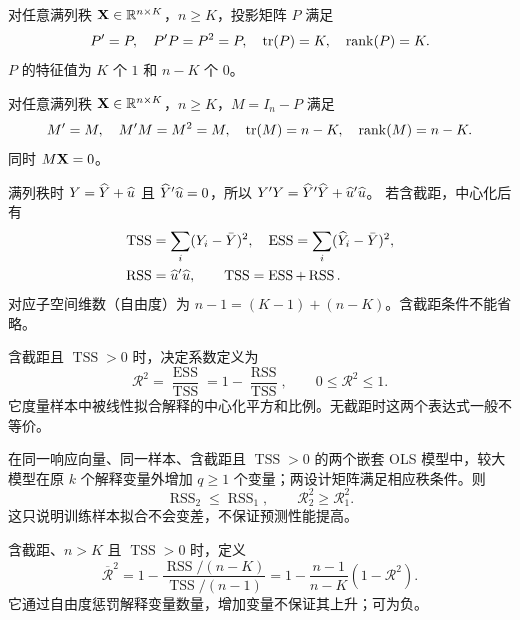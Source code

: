 \begin{theorem}[投影矩阵的性质]\label{reg:entry:43}
对任意满列秩 $\mathbf{X}\in\mathbb{R}^{n\times K}$，$n\geq K$，投影矩阵 $P$ 满足
\[P'=P,\quad P'P=P^2=P,\quad \operatorname{tr}(P)=K,\quad\operatorname{rank}(P)=K.\]
$P$ 的特征值为 $K$ 个 $1$ 和 $n-K$ 个 $0$。
\end{theorem}

\begin{theorem}[消灭矩阵的性质]\label{reg:entry:44}
对任意满列秩 $\mathbf{X}\in\mathbb{R}^{n\times K}$，$n\geq K$，$M=I_n-P$ 满足
\[M'=M,\quad M'M=M^2=M,\quad \operatorname{tr}(M)=n-K,\quad\operatorname{rank}(M)=n-K.\]
同时 $M\mathbf{X}=0$。
\end{theorem}

\begin{proposition}[正交分解与平方和]\label{reg:entry:45}
满列秩时 $Y=\widehat Y+\widehat{u}$ 且 $\widehat Y'\widehat{u}=0$，所以 $Y'Y=\widehat Y'\widehat Y+\widehat{u}'\widehat{u}$。
若含截距，中心化后有
\begin{align*}
\operatorname{TSS}&=\sum_i(Y_i-\bar Y)^2,\quad
\operatorname{ESS}=\sum_i(\widehat Y_i-\bar Y)^2,\\
\operatorname{RSS}&=\widehat{u}'\widehat{u},\qquad \operatorname{TSS}=\operatorname{ESS}+\operatorname{RSS}.
\end{align*}
对应子空间维数（自由度）为 $n-1=(K-1)+(n-K)$。含截距条件不能省略。
\end{proposition}

\begin{definition}[决定系数]\label{reg:entry:46}
含截距且 $\operatorname{TSS}>0$ 时，决定系数定义为
\[\mathcal R^2=\frac{\operatorname{ESS}}{\operatorname{TSS}}=1-\frac{\operatorname{RSS}}{\operatorname{TSS}},\qquad0\leq\mathcal R^2\leq1.\]
它度量样本中被线性拟合解释的中心化平方和比例。无截距时这两个表达式一般不等价。
\end{definition}

\begin{theorem}[加入变量后的决定系数]\label{reg:entry:47}
在同一响应向量、同一样本、含截距且 $\operatorname{TSS}>0$ 的两个嵌套 OLS 模型中，较大模型在原 $k$ 个解释变量外增加 $q\geq1$ 个变量；两设计矩阵满足相应秩条件。则
\[\operatorname{RSS}_{2}\leq\operatorname{RSS}_{1},\qquad \mathcal R_2^2\geq\mathcal R_1^2.\]
这只说明训练样本拟合不会变差，不保证预测性能提高。
\end{theorem}

\begin{definition}[调整决定系数]\label{reg:entry:48}
含截距、$n>K$ 且 $\operatorname{TSS}>0$ 时，定义
\[\overline{\mathcal R}^2=1-\frac{\operatorname{RSS}/(n-K)}{\operatorname{TSS}/(n-1)}
=1-\frac{n-1}{n-K}(1-\mathcal R^2).\]
它通过自由度惩罚解释变量数量，增加变量不保证其上升；可为负。
\end{definition}

